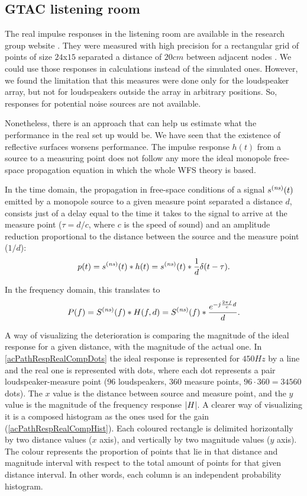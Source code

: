 \subsection{GTAC listening room}
The real impulse responses in the listening room are available in the research group website \cite{GTACroom}. They were measured with high precision for a rectangular grid of points of size $24$x$15$ separated a distance of $20\si{cm}$ between adjacent nodes \cite{Czy2011}. We could use those responses in calculations instead of the simulated ones. However, we found the limitation that
this measures were done only for the loudspeaker array, but not for loudspeakers outside the array in arbitrary positions. So, responses for potential noise sources are not available.

Nonetheless, there is an approach that can help us estimate what the performance in the real set up would be. We have seen that the existence of reflective surfaces worsens performance. The impulse response $h(t)$ from a source to a measuring point does not follow any more the ideal monopole free-space propagation equation in which the whole WFS theory is based.

In the time domain, the propagation in free-space conditions of a signal $\signal[ns][time](t)$ emitted by a monopole source to a given measure point separated a distance $d$, consists just of a delay equal to the time it takes to the signal to arrive at the measure point ($\tau = d/c$, where $c$ is the speed of sound) and an amplitude reduction proportional to the distance between the source and the measure point ($1/d$):
\begin{equation}
\Field[noValue][time](t) = \signal[ns][time](t) \ast h(t) = \signal[ns][time](t) \ast \frac{1}{d}\delta(t - \tau).
\end{equation}

In the frequency domain, this translates to
\begin{equation}
\Field[noValue][frequency](f) = \signal[ns][frequency](f) \ast H(f,d) = \signal[ns][frequency](f) \ast \frac{e^{-j\frac{2\pi f}{c}d}}{d}.
\end{equation}

A way of visualizing the deterioration is comparing the magnitude of the ideal response for a given distance, with the magnitude of the actual one. In \autoref{acPathRespRealCompDots} the ideal response is represented for $450 \si{Hz}$ by a line and the real one is represented with dots, where each dot represents a pair loudspeaker-measure point ($96$ loudspeakers, $360$ measure points, $96\cdot 360 = 34560$ dots). The $x$ value is the distance between source and measure point, and the $y$ value is the magnitude of the frequency response $\left| H \right|$. A clearer way of visualizing it is a composed histogram as the ones used for the gain (\autoref{acPathRespRealCompHist}). 
Each coloured rectangle is delimited horizontally by two distance values ($x$ axis), and vertically by two magnitude values ($y$ axis). The colour represents the proportion of points that lie in that distance and magnitude interval with respect to the total amount of points for that given distance interval. In other words, each column is an independent probability histogram.

